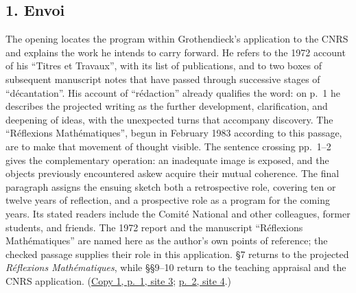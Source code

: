 \documentclass[11pt,a4paper]{article}
\begin{document}
\subsection*{1. Envoi}
The opening locates the program within Grothendieck's application to the
CNRS and explains the work he intends to carry forward. He refers to the
1972 account of his ``Titres et Travaux'', with its list of publications,
and to two boxes of subsequent manuscript notes that have passed through
successive stages of ``décantation''. His account of ``rédaction'' already
qualifies the word: on p.~1 he describes the projected writing as the
further development, clarification, and deepening of ideas, with the
unexpected turns that accompany discovery. The ``Réflexions Mathématiques'',
begun in February 1983 according to this passage, are to make that movement
of thought visible. The sentence crossing pp.~1--2 gives the complementary
operation: an inadequate image is exposed, and the objects previously
encountered askew acquire their mutual coherence. The final paragraph
assigns the ensuing sketch both a retrospective role, covering ten or
twelve years of reflection, and a prospective role as a program for the
coming years. Its stated readers include the Comité National and other
colleagues, former students, and friends. The 1972 report and the manuscript
``Réflexions Mathématiques'' are named here as the author's own points of
reference; the checked passage supplies their role in this application.
\S7 returns to the projected \emph{Réflexions Mathématiques}, while
\S\S9--10 return to the teaching appraisal and the CNRS application.
(\href{https://grothendieck.umontpellier.fr/web/viewer.html?file=../119.pdf\#page=4}{Copy 1, p.~1, site 3};
\href{https://grothendieck.umontpellier.fr/web/viewer.html?file=../119.pdf\#page=5}{p.~2, site 4}.)
\end{document}
